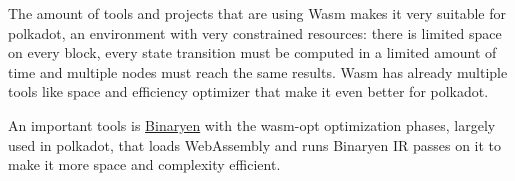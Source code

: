 \documentclass[../main.tex]{subfiles}
\begin{document}
The amount of tools and projects that are using Wasm makes it very suitable for polkadot, an environment with very constrained resources: there is limited space on every block, every state transition must be computed in a limited amount of time and multiple nodes must reach the same results. Wasm has already multiple tools like space and efficiency optimizer that make it even better for polkadot.

An important tools is \href{https://github.com/WebAssembly/binaryen}{Binaryen} with the wasm-opt optimization phases, largely used in polkadot, that loads WebAssembly and runs Binaryen IR passes on it to make it more space and complexity efficient.

\end{document}
